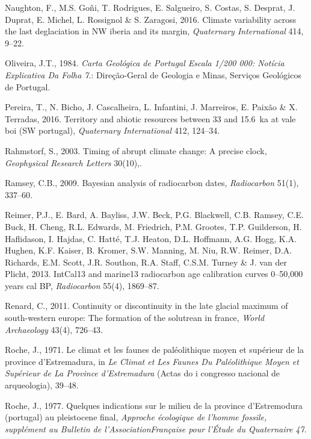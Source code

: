 \documentclass[12pt,twoside]{reedthesis}
\begin{document}
\leavevmode\hypertarget{ref-naughton2016}{}%
Naughton, F., M.S. Goñi, T. Rodrigues, E. Salgueiro, S. Costas, S. Desprat, J. Duprat, E. Michel, L. Rossignol \& S. Zaragosi, 2016. Climate variability across the last deglaciation in NW iberia and its margin, \emph{Quaternary International} 414, 9--22.

\leavevmode\hypertarget{ref-oliveira1984}{}%
Oliveira, J.T., 1984. \emph{Carta Geológica de Portugal Escala 1/200 000: Notícia Explicativa Da Folha 7}.: Direção-Geral de Geologia e Minas, Serviços Geológicos de Portugal.

\leavevmode\hypertarget{ref-pereira2016}{}%
Pereira, T., N. Bicho, J. Cascalheira, L. Infantini, J. Marreiros, E. Paixão \& X. Terradas, 2016. Territory and abiotic resources between 33 and 15.6~ka at vale boi (SW portugal), \emph{Quaternary International} 412, 124--34.

\leavevmode\hypertarget{ref-rahmstorf2003}{}%
Rahmstorf, S., 2003. Timing of abrupt climate change: A precise clock, \emph{Geophysical Research Letters} 30(10),.

\leavevmode\hypertarget{ref-ramsey2009}{}%
Ramsey, C.B., 2009. Bayesian analysis of radiocarbon dates, \emph{Radiocarbon} 51(1), 337--60.

\leavevmode\hypertarget{ref-reimer2013}{}%
Reimer, P.J., E. Bard, A. Bayliss, J.W. Beck, P.G. Blackwell, C.B. Ramsey, C.E. Buck, H. Cheng, R.L. Edwards, M. Friedrich, P.M. Grootes, T.P. Guilderson, H. Haflidason, I. Hajdas, C. Hatté, T.J. Heaton, D.L. Hoffmann, A.G. Hogg, K.A. Hughen, K.F. Kaiser, B. Kromer, S.W. Manning, M. Niu, R.W. Reimer, D.A. Richards, E.M. Scott, J.R. Southon, R.A. Staff, C.S.M. Turney \& J. van der Plicht, 2013. IntCal13 and marine13 radiocarbon age calibration curves 0--50,000 years cal BP, \emph{Radiocarbon} 55(4), 1869--87.

\leavevmode\hypertarget{ref-renard2011}{}%
Renard, C., 2011. Continuity or discontinuity in the late glacial maximum of south-western europe: The formation of the solutrean in france, \emph{World Archaeology} 43(4), 726--43.

\leavevmode\hypertarget{ref-roche1971}{}%
Roche, J., 1971. Le climat et les faunes de paléolithique moyen et supérieur de la province d'Estremadura, in \emph{Le Climat et Les Faunes Du Paléolithique Moyen et Supérieur de La Province d'Estremadura} (Actas do i congresso nacional de arqueologia), 39--48.

\leavevmode\hypertarget{ref-roche1977}{}%
Roche, J., 1977. Quelques indications sur le milieu de la province d'Estremodura (portugal) au pleistocene final, \emph{Approche écologique de l'homme fossile, supplément au Bulletin de l'AssociationFrançaise pour l'Étude du Quaternaire 47}.
\end{document}
